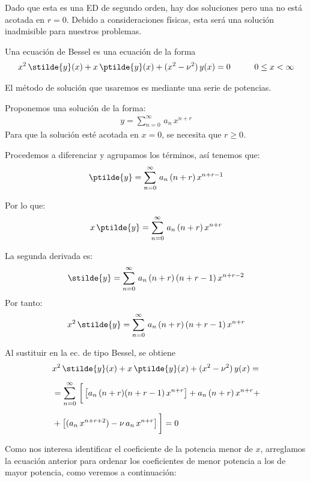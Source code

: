 Dado que esta es una ED de segundo orden, hay dos soluciones pero una no está acotada en $r=0$. Debido a consideraciones físicas, esta será una solución inadmisible para nuestros problemas.

Una ecuación de Bessel es una ecuación de la forma
\begin{align*}
x^{2} \, \stilde{y} (x) + x \,\ptilde{y} (x) + (x^{2} - \nu^{2}) \, y(x) = 0 \hspace{1cm} 0 \leq x < \infty
\end{align*}

El método de solución que usaremos es mediante una serie de potencias.

Proponemos una solución de la forma:
\begin{align*}
y = \sum_{n=0}^{\infty} \, a_{n} \, x^{n+r}
\end{align*}
Para que la solución esté acotada en $x = 0$, se necesita que $r \geq 0$.

Procedemos a diferenciar y agrupamos los términos, así tenemos que:
\begin{align*}
\ptilde{y} = \sum_{n=0}^{\infty} \, a_{n} \, (n + r) \, x^{n+r-1}
\end{align*}

Por lo que:
\begin{align*}
x \, \ptilde{y} = \sum_{n=0}^{\infty} \, a_{n} \, (n + r) \, x^{n+r}
\end{align*}

La segunda derivada es:
\begin{align*}
\stilde{y} = \sum_{n=0}^{\infty} \, a_{n} \, (n + r) \, (n + r - 1) \, x^{n+r-2}
\end{align*}
Por tanto:
\begin{align*}
x^{2} \, \stilde{y} = \sum_{n=0}^{\infty} \, a_{n} \, (n + r) \, (n + r - 1) \, x^{n+r}
\end{align*}

Al sustituir en la ec. de tipo Bessel, se obtiene
\begin{align*}
&x^{2} \, \stilde{y} (x) + x \,\ptilde{y} (x) + (x^{2} - \nu^{2}) \, y(x) = \\[0.5em]
&= \sum_{n=0}^{\infty} \, \bigg[ \left[ a_{n} \, (n + r) (n + r -1) \, x^{n+r} \right] + a_{n} \, (n + r) \, x^{n+r} + \\[0.5em]
&+ \left[ (a_{n} \, x^{n+r+2} ) - \nu \, a_{n} \, x^{n+r} \right] \bigg] = 0
\end{align*}

Como nos interesa identificar el coeficiente de la potencia menor de $x$, arreglamos la ecuación anterior para ordenar los coeficientes de menor potencia a los de mayor potencia, como veremos a continuación:

